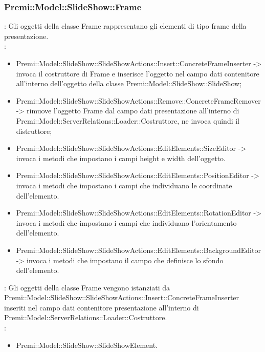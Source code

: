 {           \subsubsection{Premi::Model::SlideShow::Frame}{
				\textbf{\tipo}: Gli oggetti della classe Frame rappresentano gli elementi di tipo frame della presentazione.\\
				\textbf{\relaz}: 
				\begin{itemize}
					\item Premi::Model::SlideShow::SlideShowActions::Insert::ConcreteFrameInserter -> invoca il costruttore di Frame e inserisce l’oggetto nel campo dati contenitore all’interno dell’oggetto della classe Premi::Model::SlideShow::SlideShow;
                    \item Premi::Model::SlideShow::SlideShowActions::Remove::ConcreteFrameRemover -> rimuove l’oggetto Frame dal campo dati presentazione all’interno di Premi::Model::ServerRelations::Loader::Costruttore, ne invoca quindi il distruttore;
                    \item Premi::Model::SlideShow::SlideShowActions::EditElements::SizeEditor -> invoca i metodi che impostano i campi height e width dell'oggetto.
                    \item Premi::Model::SlideShow::SlideShowActions::EditElements::PositionEditor -> invoca i metodi che impostano i campi che individuano le coordinate dell'elemento.
                    \item Premi::Model::SlideShow::SlideShowActions::EditElements::RotationEditor -> invoca i metodi che impostano i campi che individuano l'orientamento dell'elemento.
                    \item Premi::Model::SlideShow::SlideShowActions::EditElements::BackgroundEditor -> invoca i metodi che impostano il campo che definisce lo sfondo dell'elemento.
				\end{itemize}	
                \textbf{\interfacce}: Gli oggetti della classe Frame vengono istanziati da Premi::Model::SlideShow::SlideShowActions::Insert::ConcreteFrameInserter inseriti nel campo dati contenitore presentazione all’interno di Premi::Model::ServerRelations::Loader::Costruttore.\\
                \textbf{\base}: 
                    \begin{itemize}
                    \item Premi::Model::SlideShow::SlideShowElement.
                    \end{itemize}
                    }
}
